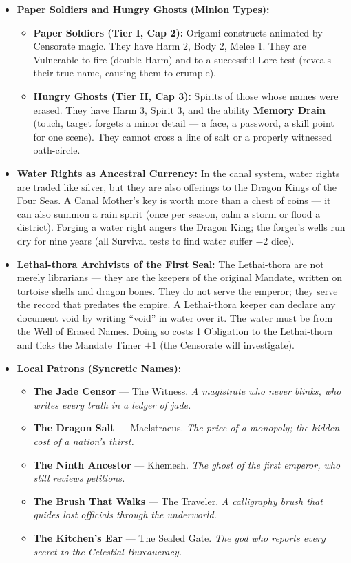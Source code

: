 \begin{itemize}
\item \textbf{Paper Soldiers and Hungry Ghosts (Minion Types):}
  \begin{itemize}
    \item \textbf{Paper Soldiers (Tier I, Cap 2):} Origami constructs animated by Censorate magic. They have Harm 2, Body 2, Melee 1. They are Vulnerable to fire (double Harm) and to a successful Lore test (reveals their true name, causing them to crumple).
    \item \textbf{Hungry Ghosts (Tier II, Cap 3):} Spirits of those whose names were erased. They have Harm 3, Spirit 3, and the ability \textbf{Memory Drain} (touch, target forgets a minor detail --- a face, a password, a skill point for one scene). They cannot cross a line of salt or a properly witnessed oath-circle.
  \end{itemize}

\item \textbf{Water Rights as Ancestral Currency:} In the canal system, water rights are traded like silver, but they are also offerings to the Dragon Kings of the Four Seas. A Canal Mother's key is worth more than a chest of coins --- it can also summon a rain spirit (once per season, calm a storm or flood a district). Forging a water right angers the Dragon King; the forger's wells run dry for nine years (all Survival tests to find water suffer $-2$ dice).

\item \textbf{Lethai-thora Archivists of the First Seal:} The Lethai-thora are not merely librarians --- they are the keepers of the original Mandate, written on tortoise shells and dragon bones. They do not serve the emperor; they serve the record that predates the empire. A Lethai-thora keeper can declare any document void by writing ``void'' in water over it. The water must be from the Well of Erased Names. Doing so costs 1 Obligation to the Lethai-thora and ticks the Mandate Timer $+1$ (the Censorate will investigate).

\item \textbf{Local Patrons (Syncretic Names):}
  \begin{itemize}
    \item \textbf{The Jade Censor} --- The Witness. \textit{A magistrate who never blinks, who writes every truth in a ledger of jade.}
    \item \textbf{The Dragon Salt} --- Maelstraeus. \textit{The price of a monopoly; the hidden cost of a nation's thirst.}
    \item \textbf{The Ninth Ancestor} --- Khemesh. \textit{The ghost of the first emperor, who still reviews petitions.}
    \item \textbf{The Brush That Walks} --- The Traveler. \textit{A calligraphy brush that guides lost officials through the underworld.}
    \item \textbf{The Kitchen's Ear} --- The Sealed Gate. \textit{The god who reports every secret to the Celestial Bureaucracy.}
  \end{itemize}
\end{itemize}

